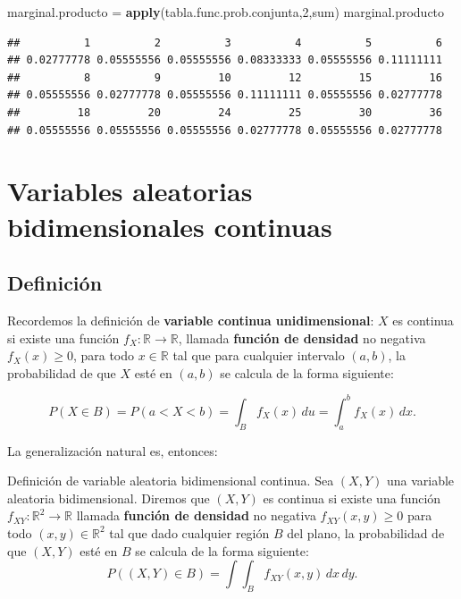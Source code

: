 \documentclass[]{book}
\newenvironment{Shaded}{\begin{snugshade}}{\end{snugshade}}
\newcommand{\DecValTok}[1]{\textcolor[rgb]{0.00,0.00,0.81}{#1}}
\newcommand{\KeywordTok}[1]{\textcolor[rgb]{0.13,0.29,0.53}{\textbf{#1}}}
\newcommand{\NormalTok}[1]{#1}
\newcommand{\StringTok}[1]{\textcolor[rgb]{0.31,0.60,0.02}{#1}}
\begin{document}
\begin{Shaded}
\begin{Highlighting}[]
\NormalTok{marginal.producto =}\StringTok{ }\KeywordTok{apply}\NormalTok{(tabla.func.prob.conjunta,}\DecValTok{2}\NormalTok{,sum)}
\NormalTok{marginal.producto}
\end{Highlighting}
\end{Shaded}

\begin{verbatim}
##          1          2          3          4          5          6 
## 0.02777778 0.05555556 0.05555556 0.08333333 0.05555556 0.11111111 
##          8          9         10         12         15         16 
## 0.05555556 0.02777778 0.05555556 0.11111111 0.05555556 0.02777778 
##         18         20         24         25         30         36 
## 0.05555556 0.05555556 0.05555556 0.02777778 0.05555556 0.02777778
\end{verbatim}

\hypertarget{variables-aleatorias-bidimensionales-continuas}{%
\section{Variables aleatorias bidimensionales continuas}\label{variables-aleatorias-bidimensionales-continuas}}

\hypertarget{definiciuxf3n-2}{%
\subsection{Definición}\label{definiciuxf3n-2}}

Recordemos la definición de \textbf{variable continua unidimensional}: \(X\) es continua si existe una función \(f_X:\mathbb{R}\longrightarrow \mathbb{R}\), llamada \textbf{función de densidad} no negativa \(f_X(x)\geq 0\), para todo \(x\in\mathbb{R}\) tal que para cualquier intervalo \((a,b)\), la probabilidad de que \(X\) esté en \((a,b)\) se calcula de la forma siguiente:

\[
P(X\in B)=P(a< X < b)=\int_B f_{X}(x)\,du=\int_a^b f_{X}(x)\,dx.
\]

La generalización natural es, entonces:

Definición de variable aleatoria bidimensional continua.
Sea \((X,Y)\) una variable aleatoria bidimensional. Diremos que \((X,Y)\) es continua si existe una función
\(f_{XY}:\mathbb{R}^2\longrightarrow \mathbb{R}\) llamada \textbf{función de densidad} no negativa \(f_{XY}(x,y)\geq 0\) para todo \((x,y)\in\mathbb{R}^2\) tal que dado cualquier región \(B\) del plano, la probabilidad de que \((X,Y)\) esté en \(B\) se calcula de la forma siguiente:
\[
P((X,Y)\in B)=\int\int_B f_{XY}(x,y)\,dx\,dy.
\]
\end{document}
